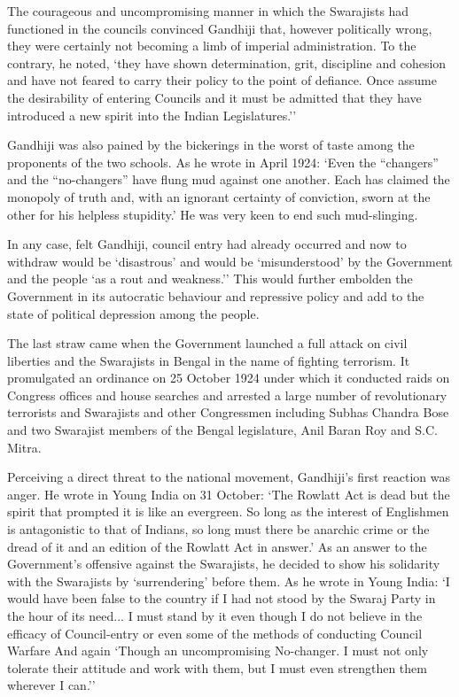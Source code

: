 The courageous and uncompromising manner in which the Swarajists had functioned in the councils convinced Gandhiji that, however politically wrong, they were certainly not becoming a limb of imperial administration. To the contrary, he noted, `they have shown determination, grit, discipline and cohesion and have not feared to carry their policy to the point of defiance. Once assume the desirability of entering Councils and it must be admitted that they have introduced a new spirit into the Indian Legislatures.''

Gandhiji was also pained by the bickerings in the worst of taste among the proponents of the two schools. As he wrote in April 1924: `Even the ``changers'' and the ``no-changers'' have flung mud against one another. Each has claimed the monopoly of truth and, with an ignorant certainty of conviction, sworn at the other for his helpless stupidity.' He was very keen to end such mud-slinging.

In any case, felt Gandhiji, council entry had already occurred and now to withdraw would be `disastrous' and would be `misunderstood' by the Government and the people `as a rout and weakness.'' This would further embolden the Government in its autocratic behaviour and repressive policy and add to the state of political depression among the people.

The last straw came when the Government launched a full attack on civil liberties and the Swarajists in Bengal in the name of fighting terrorism. It promulgated an ordinance on 25 October 1924 under which it conducted raids on Congress offices and house searches and arrested a large number of revolutionary terrorists and Swarajists and other Congressmen including Subhas Chandra Bose and two Swarajist members of the Bengal legislature, Anil Baran Roy and S.C. Mitra.

Perceiving a direct threat to the national movement, Gandhiji's first reaction was anger. He wrote in Young India on 31 October: `The Rowlatt Act is dead but the spirit that prompted it is like an evergreen. So long as the interest of Englishmen is antagonistic to that of Indians, so long must there be anarchic crime or the dread of it and an edition of the Rowlatt Act in answer.' As an answer to the Government's offensive against the Swarajists, he decided to show his solidarity with the Swarajists by `surrendering' before them. As he wrote in Young India: `I would have been false to the country if I had not stood by the Swaraj Party in the hour of its need... I must stand by it even though I do not believe in the efficacy of Council-entry or even some of the methods of conducting Council Warfare And again `Though an uncompromising No-changer. I must not only tolerate their attitude and work with them, but I must even strengthen them wherever I can.''

